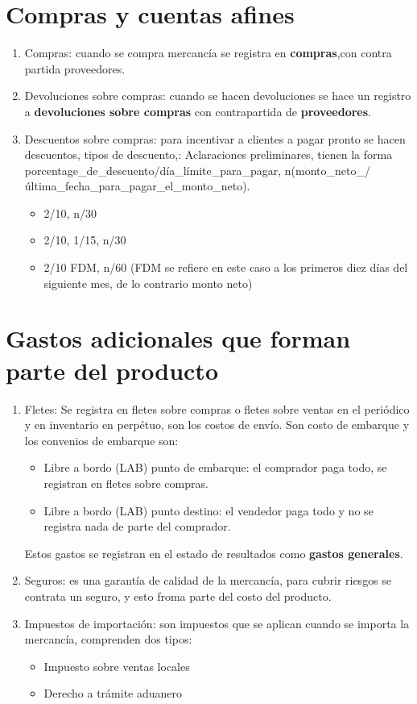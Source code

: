 \documentclass{article}
\begin{document}
\section{Compras y cuentas afines}
\begin{enumerate}
    \item Compras: cuando se compra mercancía se registra en \textbf{compras},con contra partida proveedores.
    \item Devoluciones sobre compras: cuando se hacen devoluciones se hace un registro a \textbf{devoluciones sobre compras} con contrapartida de \textbf{proveedores}.
    \item Descuentos sobre compras: para incentivar a clientes a pagar pronto se hacen descuentos, tipos de descuento,: \newline 
    Aclaraciones preliminares, tienen la forma porcentage\_de\_descuento/día\_límite\_para\_pagar, n(monto\_neto\_/última\_fecha\_para\_pagar\_el\_monto\_neto).
    \begin{itemize}
        \item 2/10, n/30
        \item 2/10, 1/15, n/30
        \item 2/10 FDM, n/60 (FDM se refiere en este caso a los primeros diez días del siguiente mes, de lo contrario monto neto)
    \end{itemize}
\end{enumerate}

\section{Gastos adicionales que forman parte del producto}
\begin{enumerate}
    \item Fletes: Se registra en fletes sobre compras o fletes sobre ventas en el periódico y en inventario en perpétuo, son los costos de envío. Son costo de embarque y los convenios de embarque son:
    \begin{itemize}
        \item Libre a bordo (LAB) punto de embarque: el comprador paga todo, se registran en fletes sobre compras.
        \item Libre a bordo (LAB) punto destino: el vendedor paga todo y no se registra nada de parte del comprador.
    \end{itemize}
    Estos gastos se registran en el estado de resultados como \textbf{gastos generales}.


    \item Seguros: es una garantía de calidad de la mercancía, para cubrir riesgos se contrata un seguro, y esto froma parte del costo del producto.

    \item Impuestos de importación: son impuestos que se aplican cuando se importa la mercancía, comprenden dos tipos: 
    \begin{itemize}
        \item Impuesto sobre ventas locales
        \item Derecho a trámite aduanero
    \end{itemize}
\end{enumerate}
\end{document}
